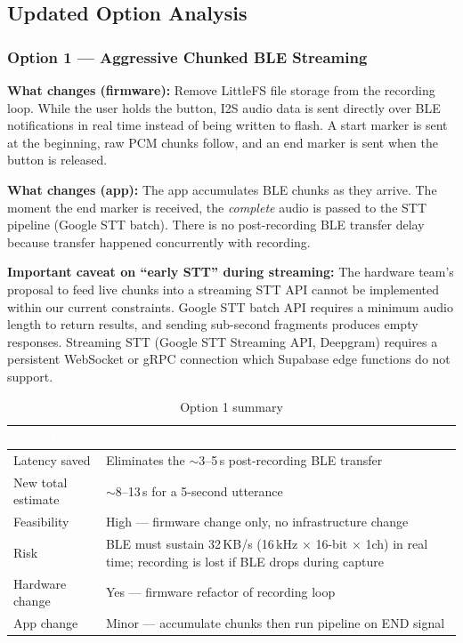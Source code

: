 \documentclass[12pt,a4paper]{article}
\begin{document}
\subsection{Updated Option Analysis}

\subsubsection{Option 1 — Aggressive Chunked BLE Streaming}

\textbf{What changes (firmware):} Remove LittleFS file storage from the recording loop.
While the user holds the button, I2S audio data is sent directly over BLE notifications
in real time instead of being written to flash. A start marker is sent at the beginning,
raw PCM chunks follow, and an end marker is sent when the button is released.

\textbf{What changes (app):} The app accumulates BLE chunks as they arrive. The moment the
end marker is received, the \emph{complete} audio is passed to the STT pipeline (Google STT
batch). There is no post-recording BLE transfer delay because transfer happened concurrently
with recording.

\textbf{Important caveat on ``early STT'' during streaming:} The hardware team's proposal to
feed live chunks into a streaming STT API cannot be implemented within our current constraints.
Google STT batch API requires a minimum audio length to return results, and sending sub-second
fragments produces empty responses. Streaming STT (Google STT Streaming API, Deepgram) requires
a persistent WebSocket or gRPC connection which Supabase edge functions do not support.

\begin{table}[h!]
\centering
\renewcommand{\arraystretch}{1.3}
\begin{tabularx}{\linewidth}{|l|X|}
\hline
\rowcolor{primary}
\textcolor{white}{\textbf{Aspect}} & \textcolor{white}{\textbf{Detail}} \\
\hline
Latency saved        & Eliminates the $\sim$3--5\,s post-recording BLE transfer \\
\hline
\rowcolor{rowalt}
New total estimate   & $\sim$8--13\,s for a 5-second utterance \\
\hline
Feasibility          & High — firmware change only, no infrastructure change \\
\hline
\rowcolor{rowalt}
Risk                 & BLE must sustain 32\,KB/s (16\,kHz $\times$ 16-bit $\times$ 1ch) in real time; recording is lost if BLE drops during capture \\
\hline
Hardware change      & Yes — firmware refactor of recording loop \\
\hline
\rowcolor{rowalt}
App change           & Minor — accumulate chunks then run pipeline on END signal \\
\hline
\end{tabularx}
\caption{Option 1 summary}
\end{table}
\end{document}
